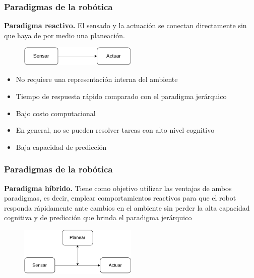 \documentclass[10pt,spanish,aspectratio=1610]{beamer}
\begin{document}
\begin{frame}\frametitle{Paradigmas de la robótica}
  \textbf{Paradigma reactivo.} El sensado y la actuación se conectan directamente sin que haya de por medio una planeación.
  \begin{figure}
    \centering
    \includegraphics[width=0.5\textwidth]{Figures/ParadigmReactive.pdf}
  \end{figure}
  \begin{itemize}
  \item No requiere una representación interna del ambiente
  \item Tiempo de respuesta rápido comparado con el paradigma jerárquico
  \item Bajo costo computacional
  \item En general, no se pueden resolver tareas con alto nivel cognitivo
  \item Baja capacidad de predicción
  \end{itemize}
\end{frame}

\begin{frame}\frametitle{Paradigmas de la robótica}
  \textbf{Paradigma híbrido.} Tiene como objetivo utilizar las ventajas de ambos paradigmas, es decir, emplear comportamientos reactivos para que el robot responda rápidamente ante cambios en el ambiente sin perder la alta capacidad cognitiva y de predicción que brinda el paradigma jerárquico
  \begin{figure}
    \centering
    \includegraphics[width=0.5\textwidth]{Figures/ParadigmHybrid.pdf}
  \end{figure}
\end{frame}


\end{document}
